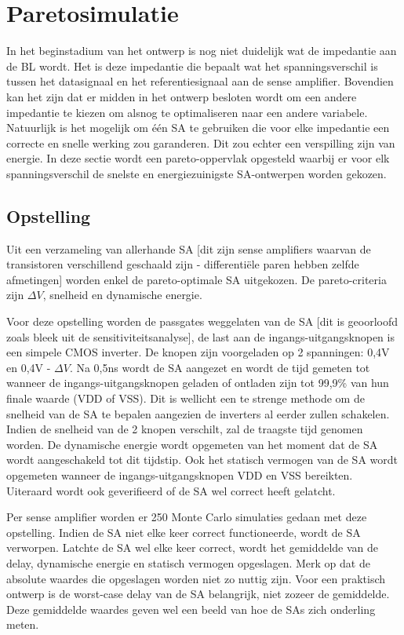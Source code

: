 \section{Paretosimulatie}
In het beginstadium van het ontwerp is nog niet duidelijk wat de impedantie aan de BL wordt. Het is deze impedantie die bepaalt wat het spanningsverschil is tussen het datasignaal en het referentiesignaal aan de sense amplifier. Bovendien kan het zijn dat er midden in het ontwerp besloten wordt om een andere impedantie te kiezen om alsnog te optimaliseren naar een andere variabele.
Natuurlijk is het mogelijk om één SA te gebruiken die voor elke impedantie een correcte en snelle werking zou garanderen. Dit zou echter een verspilling zijn van energie. In deze sectie wordt een pareto-oppervlak opgesteld waarbij er voor elk spanningsverschil de snelste en energiezuinigste SA-ontwerpen worden gekozen.

\subsection{Opstelling}
Uit een verzameling van allerhande SA [dit zijn sense amplifiers waarvan de transistoren verschillend geschaald zijn - differentiële paren hebben zelfde afmetingen] worden enkel de pareto-optimale SA uitgekozen. De pareto-criteria zijn $\Delta V$, snelheid en dynamische energie. 

Voor deze opstelling worden de passgates weggelaten van de SA [dit is geoorloofd zoals bleek uit de sensitiviteitsanalyse], de last aan de ingangs-uitgangsknopen is een simpele CMOS inverter. De knopen zijn voorgeladen op 2 spanningen: 0,4V en 0,4V - $\Delta V$. Na 0,5ns wordt de SA aangezet en wordt de tijd gemeten tot wanneer de ingangs-uitgangsknopen geladen of ontladen zijn tot 99,9\% van hun finale waarde (VDD of VSS). Dit is wellicht een te strenge methode om de snelheid van de SA te bepalen aangezien de inverters al eerder zullen schakelen. Indien de snelheid van de 2 knopen verschilt, zal de traagste tijd genomen worden. De dynamische energie wordt opgemeten van het moment dat de SA wordt aangeschakeld tot dit tijdstip. Ook het statisch vermogen van de SA wordt opgemeten wanneer de ingangs-uitgangsknopen VDD en VSS bereikten. Uiteraard wordt ook geverifieerd of de SA wel correct heeft gelatcht.

Per sense amplifier worden er 250 Monte Carlo simulaties gedaan met deze opstelling. Indien de SA niet elke keer correct functioneerde, wordt de SA verworpen. Latchte de SA wel elke keer correct, wordt het gemiddelde van de delay, dynamische energie  en statisch vermogen opgeslagen. Merk op dat de absolute waardes die opgeslagen worden niet zo nuttig zijn. Voor een praktisch ontwerp is de worst-case delay van de SA belangrijk, niet zozeer de gemiddelde. Deze gemiddelde waardes geven wel een beeld van hoe de SAs zich onderling meten.  

